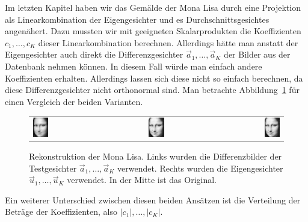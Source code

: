 Im letzten Kapitel haben wir das Gemälde der Mona Lisa durch eine Projektion als Linearkombination der Eigengesichter und es Durchschnittsgesichtes angenähert.
Dazu mussten wir mit geeigneten Skalarprodukten die Koeffizienten $c_1,\ldots,c_K$ dieser Linearkombination berechnen.
Allerdings hätte man anstatt der Eigengesichter auch direkt die Differenzgesichter $\vec a_1,\ldots,\vec a_K$ der Bilder aus der Datenbank nehmen können.
In diesem Fall würde man einfach andere Koeffizienten erhalten.
Allerdings lassen sich diese nicht so einfach berechnen, da diese Differenzgesichter nicht orthonormal sind.
Man betrachte Abbildung~\ref{fig:mona_lisa_reconstruction} für einen Vergleich der beiden Varianten.
\begin{figure}[ht]
	\centering
	\begin{tabular}{lcr}
		\includegraphics[width=0.2\textwidth]{images/eigenfaces/mona_lisa_naive_approx} &
		\includegraphics[width=0.2\textwidth]{images/eigenfaces/mona_lisa_original} & \includegraphics[width=0.2\textwidth]{images/eigenfaces/mona_lisa_eigen_approx}
	\end{tabular}
	\caption{Rekonstruktion der Mona Lisa. Links wurden die Differenzbilder der Testgesichter $\vec a_1,\ldots,\vec a_K$ verwendet. Rechts wurden die Eigengesichter $\vec u_1,\ldots,\vec u_K$ verwendet. In der Mitte ist das Original.}
	\label{fig:mona_lisa_reconstruction}
\end{figure}
Ein weiterer Unterschied zwischen diesen beiden Ansätzen ist die Verteilung der Beträge der Koeffizienten, also $\lvert c_1\rvert,\ldots,\lvert c_K\rvert$.
